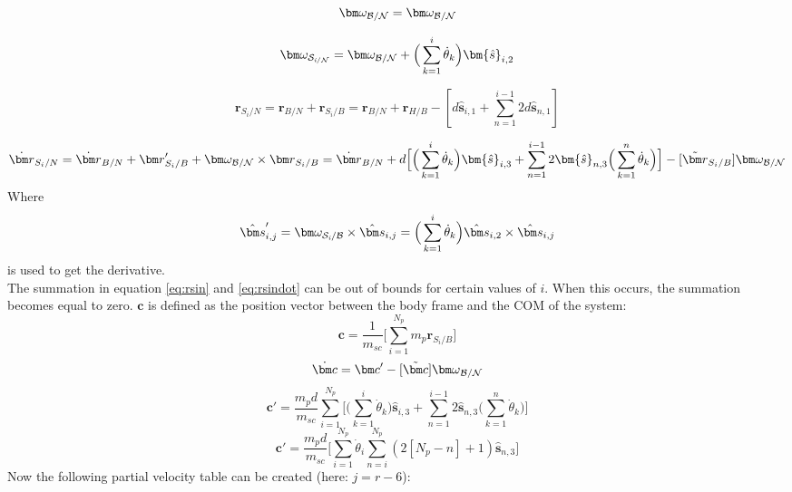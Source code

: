 \begin{equation}
	\bm \omega_{\cal{B/N}} = \bm \omega_{\cal{B/N}}
\end{equation}

\begin{equation}
	\bm \omega_{\cal S_{\textit{i}/N}} = \bm \omega_{\cal{B/N}} + \Big(\sum_{k=1}^{i} \dot{\theta}_k \Big) \bm{\hat{s}}_{i,2}
\end{equation}

\begin{equation}
	\label{eq:rsin}
	\bm r_{S_{i}/N} = \bm r_{B/N} + \bm r_{S_{i}/B} = \bm r_{B/N} + \bm r_{H/B} - [d\bm{\hat{s}}_{i,1} + \sum_{n=1}^{i-1} 2d\bm{\hat{s}}_{n,1} ]
\end{equation}

\begin{equation}
	\label{eq:rsindot}
	\dot{\bm r}_{S_{i}/N} = \dot{\bm r}_{B/N} + {\bm r}'_{S_{i}/B} + \bm \omega_{\cal{B/N}} \times {\bm r}_{S_{i}/B} = \dot{\bm r}_{B/N} + d\Big[\Big(\sum_{k=1}^{i} \dot{\theta}_k \Big) \bm{\hat{s}}_{i,3} + \sum_{n=1}^{i-1} 2\bm{\hat{s}}_{n,3}\Big(\sum_{k=1}^{n} \dot{\theta}_k \Big) \Big]  - [\tilde{{\bm r}}_{S_{i}/B}] \bm \omega_{\cal{B/N}}
\end{equation}
Where
\begin{equation}
	\label{eq:sijp}
	\hat{\bm s}'_{i,j} = \bm\omega_{\cal{S}_{\textit{i}}/\cal{B}}\times\hat{\bm s}_{i,j}=\Big(\sum_{k=1}^{i} \dot{\theta}_k \Big)\hat{\bm s}_{i,2}\times\hat{\bm s}_{i,j}
\end{equation}
is used to get the derivative.\\
The summation in equation \ref{eq:rsin} and \ref{eq:rsindot} can be out of bounds for certain values of $i$. When this occurs, the summation becomes equal to zero. $\bm c$ is defined as the position vector between the body frame and the COM of the system:
\begin{equation}
	\bm c = \frac{1}{m_{sc}}\Big[ \sum_{i=1}^{N_p} m_p {\bm r}_{S_i/B}\Big]
\end{equation}
\begin{equation}
	\dot{\bm c} = {\bm c}' - [\tilde{\bm c}]{\bm \omega}_{\cal{B/N}}
\end{equation}
\begin{equation}
	{\bm c}' = \frac{m_p d}{m_{sc}} \sum_{i=1}^{N_p} \Big[\Big(\sum_{k=1}^{i} \dot{\theta}_k \Big) \bm{\hat{s}}_{i,3} + \sum_{n=1}^{i-1} 2\bm{\hat{s}}_{n,3}\Big(\sum_{k=1}^{n} \dot{\theta}_k \Big) \Big]
	\label{eq:cprime1}
\end{equation}
\begin{equation}
	{\bm c}' = \frac{m_p d}{m_{sc}} \Big[\sum_{i=1}^{N_p} \dot{\theta}_i  \sum_{n=i}^{N_p} (2[N_p - n]+1 )\bm{\hat{s}}_{n,3}\Big]
	\label{eq:cprime2}
\end{equation}
Now the following partial velocity table can be created (here: $j = r-6$):

